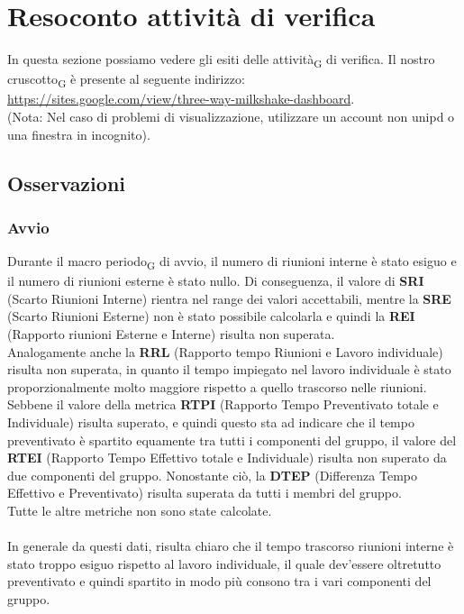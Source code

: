 
\section{Resoconto {attività} di verifica}
In questa sezione possiamo vedere gli esiti delle attività\textsubscript{G} di verifica.
Il nostro cruscotto\textsubscript{G} è presente al seguente indirizzo:\\ \url{https://sites.google.com/view/three-way-milkshake-dashboard}.\\ (Nota: Nel caso di problemi di visualizzazione, utilizzare un account non unipd o una finestra in incognito).
\subsection{Osservazioni}
\subsubsection{Avvio}
Durante il macro periodo\textsubscript{G} di avvio, il numero di riunioni interne è stato esiguo e il numero di riunioni esterne è stato nullo. Di conseguenza, il valore di \textbf{SRI} (Scarto Riunioni Interne) rientra nel range dei valori accettabili, mentre la \textbf{SRE} (Scarto Riunioni Esterne) non è stato possibile calcolarla e quindi la \textbf{REI} (Rapporto riunioni Esterne e Interne) risulta non superata. \\
Analogamente anche la \textbf{RRL} (Rapporto tempo Riunioni e Lavoro individuale) risulta non superata, in quanto il tempo impiegato nel lavoro individuale è stato proporzionalmente molto maggiore rispetto a quello trascorso nelle riunioni. \\
Sebbene il valore della metrica \textbf{RTPI} (Rapporto Tempo Preventivato totale e Individuale) risulta superato, e quindi questo sta ad indicare che il tempo preventivato è spartito equamente tra tutti i componenti del gruppo, il valore del \textbf{RTEI} (Rapporto Tempo Effettivo totale e Individuale) risulta non superato da due componenti del gruppo. Nonostante ciò, la \textbf{DTEP} (Differenza Tempo Effettivo e Preventivato) risulta superata da tutti i membri del gruppo.\\
Tutte le altre metriche non sono state calcolate.\\\\
In generale da questi dati, risulta chiaro che il tempo trascorso riunioni interne è stato troppo esiguo rispetto al lavoro individuale, il quale dev'essere oltretutto preventivato e quindi spartito in modo più consono tra i vari componenti del gruppo.

